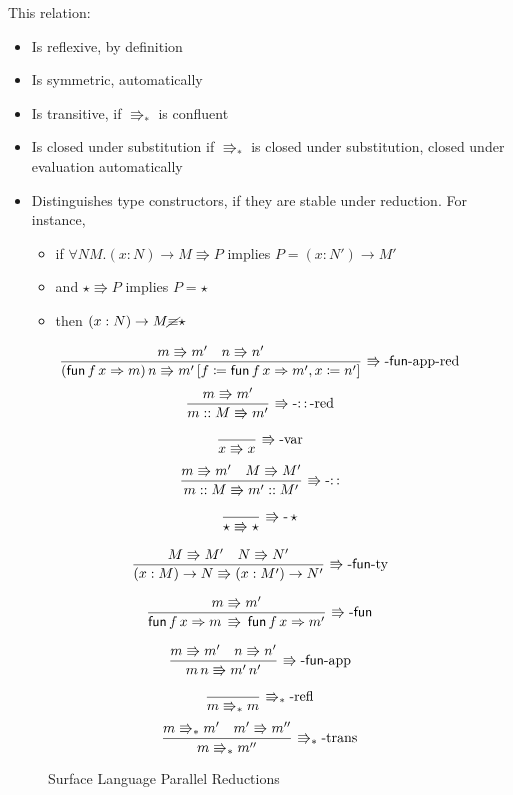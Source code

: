 This relation:
\begin{itemize}
\item Is reflexive, by definition
\item Is symmetric, automatically
\item Is transitive, if $\Rrightarrow_{\ast}$ is confluent
\item Is closed under substitution if $\Rrightarrow_{\ast}$ is closed under substitution, closed under evaluation automatically
\item Distinguishes type constructors, if they are stable under reduction.
For instance,
\begin{itemize}
\item if $\forall NM.\left(x:N\right)\rightarrow M\Rrightarrow P$ implies $P=\left(x:N'\right)\rightarrow M'$
\item and $\star\Rrightarrow P$ implies $P=\star$
\item then $\left(x:N\right)\rightarrow M\cancel{\equiv}\star$
\end{itemize}
\end{itemize}
\begin{figure}
\[
\frac{m\Rrightarrow m'\quad n\Rrightarrow n'}{\left(\mathsf{fun}\,f\,x\Rightarrow m\right)n\Rrightarrow m'\left[f\coloneqq\mathsf{fun}\,f\,x\Rightarrow m',x\coloneqq n'\right]}\,\operatorname{\Rrightarrow-\mathsf{fun}-app-red}
\]
\[
\frac{m\Rrightarrow m'}{m::M\Rrightarrow m'}\,\operatorname{\Rrightarrow-::-red}
\]
 
\[
\frac{\,}{x\Rrightarrow x}\,\operatorname{\Rrightarrow-var}
\]
\[
\frac{m\Rrightarrow m'\quad M\Rrightarrow M'}{m::M\Rrightarrow m'::M'}\,\operatorname{\Rrightarrow-::}
\]
 
\[
\frac{\,}{\star\Rrightarrow\star}\,\operatorname{\Rrightarrow-}\star
\]
 
\[
\frac{M\Rrightarrow M'\quad N\Rrightarrow N'}{\left(x:M\right)\rightarrow N\Rrightarrow\left(x:M'\right)\rightarrow N'}\,\operatorname{\Rrightarrow-\mathsf{fun}-ty}
\]
 
\[
\frac{m\Rrightarrow m'}{\mathsf{fun}\,f\,x\Rightarrow m\,\Rrightarrow\,\mathsf{fun}\,f\,x\Rightarrow m'}\,\operatorname{\Rrightarrow-\mathsf{fun}}
\]
 
\[
\frac{m\Rrightarrow m'\quad n\Rrightarrow n'}{m\,n\Rrightarrow m'\,n'}\,\operatorname{\Rrightarrow-\mathsf{fun}-app}
\]
 
\[
\frac{\,}{m\Rrightarrow_{\ast}m}\,\operatorname{\Rrightarrow_{\ast}-refl}
\]
\[
\frac{m\Rrightarrow_{\ast}m'\quad m'\Rrightarrow m''}{m\Rrightarrow_{\ast}m''}\,\operatorname{\Rrightarrow_{\ast}-trans}
\]
 
\caption{Surface Language Parallel Reductions}
\label{fig:surface-reduction}
\end{figure}

